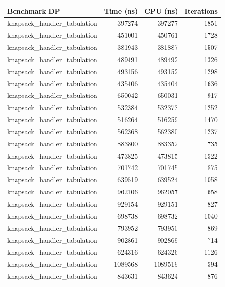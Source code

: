 \documentclass{llncs}
\begin{document}
\begin{table}[ht]
    \centering
    \begin{tabular}{@{}lrrr@{}}
                \toprule
        \textbf{Benchmark DP} & \textbf{Time (ns)} & \textbf{CPU (ns)} & \textbf{Iterations} \\
                \midrule
        knapsack\_handler\_tabulation & 397274 & 397277 & 1851 \\
        knapsack\_handler\_tabulation & 451001 & 450761 & 1728 \\
        knapsack\_handler\_tabulation & 381943 & 381887 & 1507 \\
        knapsack\_handler\_tabulation & 489491 & 489492 & 1326 \\
        knapsack\_handler\_tabulation & 493156 & 493152 & 1298 \\
        knapsack\_handler\_tabulation & 435406 & 435404 & 1636 \\
        knapsack\_handler\_tabulation & 650042 & 650031 & 917 \\
        knapsack\_handler\_tabulation & 532384 & 532373 & 1252 \\
        knapsack\_handler\_tabulation & 516264 & 516259 & 1470 \\
        knapsack\_handler\_tabulation & 562368 & 562380 & 1237 \\
        knapsack\_handler\_tabulation & 883800 & 883352 & 735 \\
        knapsack\_handler\_tabulation & 473825 & 473815 & 1522 \\
        knapsack\_handler\_tabulation & 701742 & 701745 & 875 \\
        knapsack\_handler\_tabulation & 639519 & 639524 & 1058 \\
        knapsack\_handler\_tabulation & 962106 & 962057 & 658 \\
        knapsack\_handler\_tabulation & 929154 & 929151 & 827 \\
        knapsack\_handler\_tabulation & 698738 & 698732 & 1040 \\
        knapsack\_handler\_tabulation & 793952 & 793950 & 869 \\
        knapsack\_handler\_tabulation & 902861 & 902869 & 714 \\
        knapsack\_handler\_tabulation & 624316 & 624326 & 1126 \\
        knapsack\_handler\_tabulation & 1089568 & 1089519 & 594 \\
        knapsack\_handler\_tabulation & 843631 & 843624 & 876 \\

\end{tabular}
\end{table}
\end{document}
